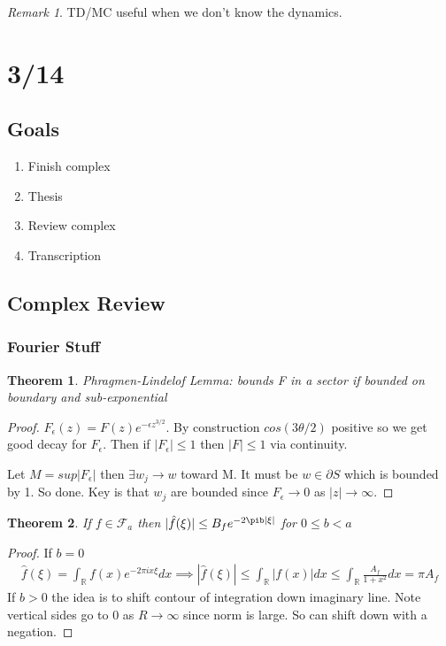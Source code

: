 \documentclass[11pt]{article}
\newcommand{\R}{\mathbb{R}}
\newtheorem{theorem}{Theorem}
\theoremstyle{remark}
\newtheorem{remark}{Remark}
\begin{document}
\begin{remark}
	TD/MC useful when we don't know the dynamics.
\end{remark}


\section{3/14}

\subsection{Goals}

\begin{enumerate}
	\item Finish complex
	\item Thesis
	\item Review complex
	\item Transcription
\end{enumerate}

\subsection{Complex Review}

\subsubsection{Fourier Stuff}

\begin{theorem}
	Phragmen-Lindelof Lemma: bounds F in a sector if bounded on boundary and sub-exponential
\end{theorem}

\begin{proof}
	$F_{\epsilon}(z) = F(z)e^{-\epsilon z^{3/2}}$. By construction $cos(3\theta /2)$ positive so we get good decay for $F_{\epsilon}$. Then if $|F_{\epsilon}| \leq 1$ then $|F| \leq 1$ via continuity.

	Let $M = sup|F_{\epsilon}|$ then $\exists w_j \to w$ toward M. It must be $w \in \partial S$ which is bounded by 1. So done. Key is that $w_j$ are bounded since $F_{\epsilon} \to 0$ as $|z| \to \infty$. 
\end{proof}

\begin{theorem}
	If $f \in \mathcal{F}_a$ then $|\hat{f}(\xi)| \leq B_f e^{-2\pib |\xi|}$ for $0 \leq b < a$
\end{theorem}

\begin{proof}
	If $b=0$
	\begin{align*}
		\hat{f}(\xi) = \int_{\R}f(x)e^{-2\pi i x \xi}dx \implies |\hat{f}(\xi)| \leq \int_{\R}|f(x)|dx \leq \int_{\R}\frac{A_f}{1+x^2}dx = \pi A_f
	\end{align*}
	If $b > 0$ the idea is to shift contour of integration down imaginary line. Note vertical sides go to 0 as $R \to \infty$ since norm is large. So can shift down with a negation.
\end{proof}
\end{document}
